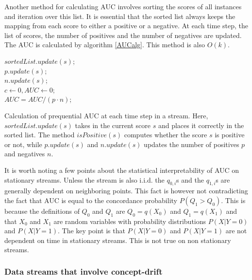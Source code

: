 Another method for calculating AUC  involves sorting the scores of all instances and iteration over this list. It is essential that the sorted list always keeps the mapping from each score to either a positive or a negative.  At each time step, the list of scores, the number of positives and the number of negatives are updated.  The AUC is calculated by algorithm \ref{AUCalg}.  This method is also $O(k)$.

\begin{algorithm}[H]
$sortedList.update(s)$;\\
$p.update(s)$;\\
$n.update(s)$;\\
$c \leftarrow 0, AUC \leftarrow 0$;\\
$ AUC = AUC/(p \cdot n)$;
\label{AUCalg}
 \caption{Calculation of prequential AUC at each time step in a stream.  Here, $sortedList.update(s)$ takes in the current score $s$ and places it correctly in the sorted list. The method $isPositive(s)$ computes whether the score $s$ is positive or not, while $p.update(s)$ and $n.update(s)$ updates the number of positives $p$ and negatives $n$.}
\end{algorithm}

It is worth noting a few points about the statistical interpretability of AUC on stationary streams.  Unless the stream is also i.i.d. the $q_{0,i}$s and the $q_{1,i}$s are generally dependent on neighboring points.  This fact is however not contradicting the fact that AUC is equal to the concordance probability $ P(Q_1 > Q_0)$.  This is because the definitions of $Q_0$ and $Q_1$ are $Q_0 = q(X_0)$ and $Q_1 = q(X_1)$ and 
that $X_0$ and $X_1$ are random variables with probability distributions $P(X | Y = 0)$ and $P(X | Y = 1)$.  The key point is that $P(X | Y = 0)$ and $P(X | Y = 1)$ are not dependent on time in stationary streams.  This is not true on non stationary streams.  


\subsubsection{Data streams that involve concept-drift}

